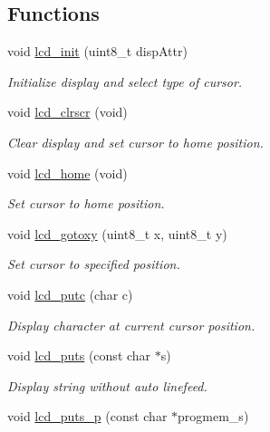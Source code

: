 \subsection*{Functions}
\begin{DoxyCompactItemize}
\item 
void \mbox{\hyperlink{group__pfleury__lcd_ga9af28b2779326b63ff4356e2b1828984}{lcd\+\_\+init}} (uint8\+\_\+t disp\+Attr)
\begin{DoxyCompactList}\small\item\em Initialize display and select type of cursor. \end{DoxyCompactList}\item 
void \mbox{\hyperlink{group__pfleury__lcd_gaf8da853dba4b9d5f2aea4e294444e14d}{lcd\+\_\+clrscr}} (void)
\begin{DoxyCompactList}\small\item\em Clear display and set cursor to home position. \end{DoxyCompactList}\item 
void \mbox{\hyperlink{group__pfleury__lcd_ga3aabf730aa4e0393bb5c959583c00a8e}{lcd\+\_\+home}} (void)
\begin{DoxyCompactList}\small\item\em Set cursor to home position. \end{DoxyCompactList}\item 
void \mbox{\hyperlink{group__pfleury__lcd_gadbf47a5efdf02367ded1ebf8f9edb5fe}{lcd\+\_\+gotoxy}} (uint8\+\_\+t x, uint8\+\_\+t y)
\begin{DoxyCompactList}\small\item\em Set cursor to specified position. \end{DoxyCompactList}\item 
void \mbox{\hyperlink{group__pfleury__lcd_gafa7e36b95c43d603f510273ad077cbbe}{lcd\+\_\+putc}} (char c)
\begin{DoxyCompactList}\small\item\em Display character at current cursor position. \end{DoxyCompactList}\item 
void \mbox{\hyperlink{group__pfleury__lcd_ga8ffdfcac7638368ff04364c14984266e}{lcd\+\_\+puts}} (const char $\ast$s)
\begin{DoxyCompactList}\small\item\em Display string without auto linefeed. \end{DoxyCompactList}\item 
void \mbox{\hyperlink{group__pfleury__lcd_ga9022a24a56a9b15681f62eb6ba77e5de}{lcd\+\_\+puts\+\_\+p}} (const char $\ast$progmem\+\_\+s)

\end{DoxyCompactItemize}
